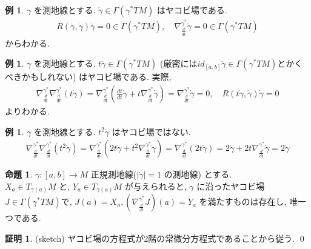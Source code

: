 \documentclass[twocolumn, landscape, a4paper , 8pt, fleqn, titlepage ]{jsarticle}
\theoremstyle{definition}
\newtheorem{ex}[dfn]{例}
\newtheorem{prop}[dfn]{命題}
\newtheorem*{pf*}{証明}
\newcommand{\abs}[1]{\left|#1\right|}
\renewcommand{\-}{\hyphen}
\begin{document}
\begin{ex}
$\gamma$ を測地線とする. $\dot \gamma \in \Gamma(\gamma ^* TM)$ はヤコビ場である. 
\begin{align*} R(\dot \gamma, \dot \gamma) \dot \gamma = 0 \in \Gamma(\gamma^* TM), \quad  \nabla^{\gamma^*} _{\frac{d}{dt} } \dot \gamma = 0 \in \Gamma(\gamma ^* TM)\end{align*}
からわかる.
\end{ex}

\begin{ex}
$\gamma$ を測地線とする. $t \dot \gamma \in \Gamma(\gamma ^* TM)$ (厳密には$id_{[a,b]} \dot \gamma \in \Gamma(\gamma ^* TM)$とかくべきかもしれない) はヤコビ場である. 
実際,
\begin{align*} \nabla^{\gamma^*} _{\frac{d}{dt} }\nabla^{\gamma^*} _{\frac{d}{dt} } (t \dot \gamma) = \nabla^{\gamma^*} _{\frac{d}{dt} } (\frac{dt}{dt} \dot \gamma + t \nabla^{\gamma^*} _{\frac{d}{dt} } \dot \gamma) = \nabla^{\gamma^*} _{\frac{d}{dt} } \dot \gamma = 0, \quad R(t \dot \gamma, \dot \gamma) \dot \gamma = 0 \end{align*}
よりわかる. 
\end{ex}

\begin{ex}
$\gamma$ を測地線とする. $t^2 \dot \gamma$ はヤコビ場ではない. 
\begin{align*} \nabla^{\gamma^*} _{\frac{d}{dt} }\nabla^{\gamma^*} _{\frac{d}{dt} } (t^2 \dot \gamma) = \nabla^{\gamma^*} _{\frac{d}{dt} }  (2t \dot \gamma + t^2 \nabla^{\gamma^*} _{\frac{d}{dt} } \dot \gamma) = \nabla^{\gamma^*} _{\frac{d}{dt} } (2t \dot \gamma) = 2 \dot \gamma + 2t \nabla^{\gamma^*} _{\frac{d}{dt} } \dot \gamma = 2 \dot \gamma \end{align*}

\end{ex}

\begin{prop}
$\gamma : [a,b] \rightarrow M$ 正規測地線($\abs{\dot \gamma } = 1$ の測地線) とする. \\
$X_a \in T_{\gamma (a) } M$ と, $Y_a \in T_{\gamma (a) } M$ が与えられると, $\gamma $ に沿ったヤコビ場$J \in \Gamma(\gamma ^* TM)$で, $J(a) = X_a, (\nabla^{\gamma^*} _{\frac{d}{dt} } J )(a) = Y_a$ を満たすものは存在し, 唯一つである. 
\end{prop}
\begin{pf*}
(sketch) ヤコビ場の方程式が2階の常微分方程式であることから従う.
\qed
\end{pf*}
\end{document}

